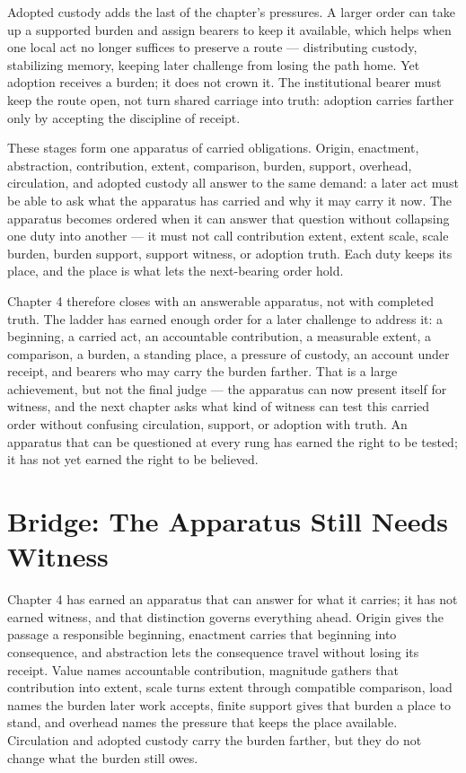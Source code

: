 Adopted custody adds the last of the chapter's pressures. A larger order can take up a supported burden and assign bearers to keep it available, which helps when one local act no longer suffices to preserve a route --- distributing custody, stabilizing memory, keeping later challenge from losing the path home. Yet adoption receives a burden; it does not crown it. The institutional bearer must keep the route open, not turn shared carriage into truth: adoption carries farther only by accepting the discipline of receipt.

These stages form one apparatus of carried obligations. Origin, enactment, abstraction, contribution, extent, comparison, burden, support, overhead, circulation, and adopted custody all answer to the same demand: a later act must be able to ask what the apparatus has carried and why it may carry it now. The apparatus becomes ordered when it can answer that question without collapsing one duty into another --- it must not call contribution extent, extent scale, scale burden, burden support, support witness, or adoption truth. Each duty keeps its place, and the place is what lets the next-bearing order hold.

Chapter 4 therefore closes with an answerable apparatus, not with completed truth. The ladder has earned enough order for a later challenge to address it: a beginning, a carried act, an accountable contribution, a measurable extent, a comparison, a burden, a standing place, a pressure of custody, an account under receipt, and bearers who may carry the burden farther. That is a large achievement, but not the final judge --- the apparatus can now present itself for witness, and the next chapter asks what kind of witness can test this carried order without confusing circulation, support, or adoption with truth. An apparatus that can be questioned at every rung has earned the right to be tested; it has not yet earned the right to be believed.

\section*{Bridge: The Apparatus Still Needs Witness}

Chapter 4 has earned an apparatus that can answer for what it carries; it has not earned witness, and that distinction governs everything ahead. Origin gives the passage a responsible beginning, enactment carries that beginning into consequence, and abstraction lets the consequence travel without losing its receipt. Value names accountable contribution, magnitude gathers that contribution into extent, scale turns extent through compatible comparison, load names the burden later work accepts, finite support gives that burden a place to stand, and overhead names the pressure that keeps the place available. Circulation and adopted custody carry the burden farther, but they do not change what the burden still owes.

